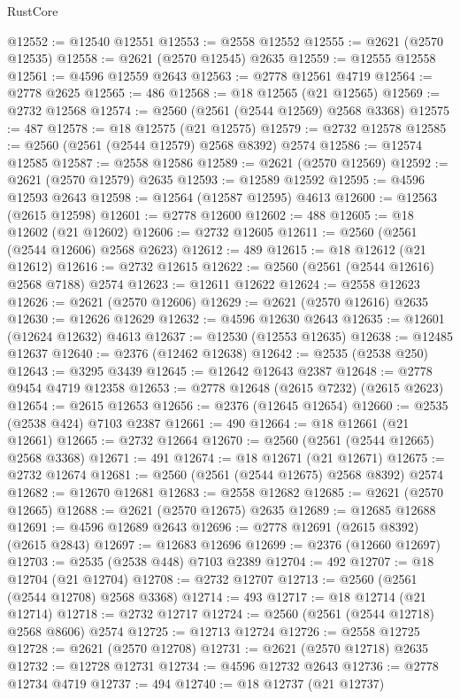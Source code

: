 \begin{lexlean}{RustCore}
\begin{coremodule}
@12552 := @12540 @12551
@12553 := @2558 @12552
@12555 := @2621 (@2570 @12535)
@12558 := @2621 (@2570 @12545) @2635
@12559 := @12555 @12558
@12561 := @4596 @12559 @2643
@12563 := @2778 @12561 @4719
@12564 := @2778 @2625
@12565 := 486
@12568 := @18 @12565 (@21 @12565)
@12569 := @2732 @12568
@12574 := @2560 (@2561 (@2544 @12569) @2568 @3368)
@12575 := 487
@12578 := @18 @12575 (@21 @12575)
@12579 := @2732 @12578
@12585 := @2560 (@2561 (@2544 @12579) @2568 @8392) @2574
@12586 := @12574 @12585
@12587 := @2558 @12586
@12589 := @2621 (@2570 @12569)
@12592 := @2621 (@2570 @12579) @2635
@12593 := @12589 @12592
@12595 := @4596 @12593 @2643
@12598 := @12564 (@12587 @12595) @4613
@12600 := @12563 (@2615 @12598)
@12601 := @2778 @12600
@12602 := 488
@12605 := @18 @12602 (@21 @12602)
@12606 := @2732 @12605
@12611 := @2560 (@2561 (@2544 @12606) @2568 @2623)
@12612 := 489
@12615 := @18 @12612 (@21 @12612)
@12616 := @2732 @12615
@12622 := @2560 (@2561 (@2544 @12616) @2568 @7188) @2574
@12623 := @12611 @12622
@12624 := @2558 @12623
@12626 := @2621 (@2570 @12606)
@12629 := @2621 (@2570 @12616) @2635
@12630 := @12626 @12629
@12632 := @4596 @12630 @2643
@12635 := @12601 (@12624 @12632) @4613
@12637 := @12530 (@12553 @12635)
@12638 := @12485 @12637
@12640 := @2376 (@12462 @12638)
@12642 := @2535 (@2538 @250)
@12643 := @3295 @3439
@12645 := @12642 @12643 @2387
@12648 := @2778 @9454 @4719 @12358
@12653 := @2778 @12648 (@2615 @7232) (@2615 @2623)
@12654 := @2615 @12653
@12656 := @2376 (@12645 @12654)
@12660 := @2535 (@2538 @424) @7103 @2387
@12661 := 490
@12664 := @18 @12661 (@21 @12661)
@12665 := @2732 @12664
@12670 := @2560 (@2561 (@2544 @12665) @2568 @3368)
@12671 := 491
@12674 := @18 @12671 (@21 @12671)
@12675 := @2732 @12674
@12681 := @2560 (@2561 (@2544 @12675) @2568 @8392) @2574
@12682 := @12670 @12681
@12683 := @2558 @12682
@12685 := @2621 (@2570 @12665)
@12688 := @2621 (@2570 @12675) @2635
@12689 := @12685 @12688
@12691 := @4596 @12689 @2643
@12696 := @2778 @12691 (@2615 @8392) (@2615 @2843)
@12697 := @12683 @12696
@12699 := @2376 (@12660 @12697)
@12703 := @2535 (@2538 @448) @7103 @2389
@12704 := 492
@12707 := @18 @12704 (@21 @12704)
@12708 := @2732 @12707
@12713 := @2560 (@2561 (@2544 @12708) @2568 @3368)
@12714 := 493
@12717 := @18 @12714 (@21 @12714)
@12718 := @2732 @12717
@12724 := @2560 (@2561 (@2544 @12718) @2568 @8606) @2574
@12725 := @12713 @12724
@12726 := @2558 @12725
@12728 := @2621 (@2570 @12708)
@12731 := @2621 (@2570 @12718) @2635
@12732 := @12728 @12731
@12734 := @4596 @12732 @2643
@12736 := @2778 @12734 @4719
@12737 := 494
@12740 := @18 @12737 (@21 @12737)

\end{coremodule}
\end{lexlean}
